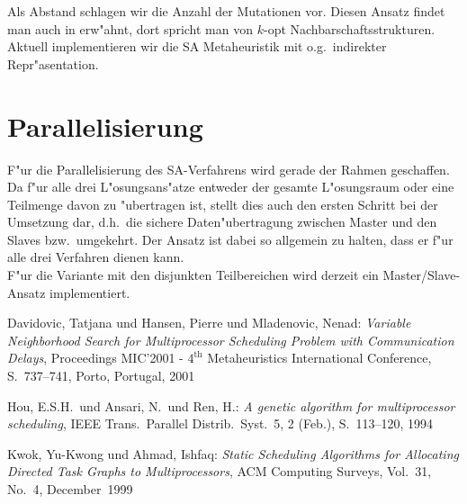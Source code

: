 \documentclass[12pt,a4paper]{article}
\begin{document}
\noindent
Als Abstand schlagen wir die Anzahl der Mutationen vor.
Diesen Ansatz findet man auch in \cite{DavidovicHansenMladenovic2001} erw"ahnt, dort
spricht man von $k$-opt Nachbarschaftsstrukturen. \\

\noindent
Aktuell implementieren wir die SA Metaheuristik mit o.g.\ indirekter Repr"asentation.

\section{Parallelisierung}
F"ur die Parallelisierung des SA-Verfahrens wird gerade der Rahmen 
geschaffen. \\

\noindent
Da f"ur alle drei L"osungsans"atze entweder der gesamte L"osungsraum 
oder eine Teilmenge davon zu "ubertragen ist, stellt dies auch den ersten 
Schritt bei der Umsetzung dar, d.h.\ die sichere Daten"ubertragung zwischen
Master und den Slaves bzw.\ umgekehrt. 
Der Ansatz ist dabei so allgemein zu halten, dass er f"ur alle drei Verfahren 
dienen kann. \\

\noindent
F"ur die Variante mit den disjunkten Teilbereichen wird derzeit ein 
Master/Slave-Ansatz implementiert.

\begin{thebibliography}{99}
Davidovic, Tatjana und Hansen, Pierre und Mladenovic, Nenad:
\emph{Variable Neighborhood Search for Multiprocessor Scheduling Problem with Communication Delays},
Proceedings MIC'2001 - $4^{\mbox{th}}$ Metaheuristics International Conference, 
S.~737--741, Porto, Portugal,
2001

Hou, E.S.H.\ und Ansari, N.\ und Ren, H.: 
\emph{A genetic algorithm for multiprocessor scheduling},
IEEE Trans.\ Parallel Distrib.\ Syst.\ 5, 2 (Feb.), S.~113--120, 1994

Kwok, Yu-Kwong und Ahmad, Ishfaq: 
\emph{Static Scheduling Algorithms for Allocating Directed Task Graphs to Multiprocessors},
ACM Computing Surveys, Vol.~31, No.~4, December~1999

\end{thebibliography}
\end{document}
